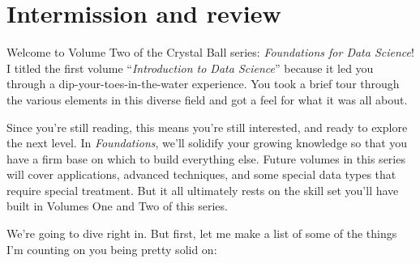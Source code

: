 
\chapter{Intermission and review}

Welcome to Volume Two of the Crystal Ball series: \textit{Foundations for Data
Science}! I titled the first volume ``\textit{Introduction to Data Science}''
because it led you through a dip-your-toes-in-the-water experience. You took a
brief tour through the various elements in this diverse field and got a feel
for what it was all about.

Since you're still reading, this means you're still interested, and ready to
explore the next level. In \textit{Foundations}, we'll solidify your growing
knowledge so that you have a firm base on which to build everything else.
Future volumes in this series will cover applications, advanced techniques, and
some special data types that require special treatment. But it all ultimately
rests on the skill set you'll have built in Volumes One and Two of this series.

We're going to dive right in. But first, let me make a list of some of the
things I'm counting on you being pretty solid on:

